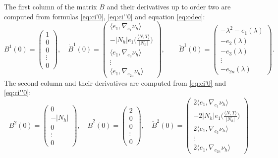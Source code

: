 \documentclass[10pt]{amsart}
\theoremstyle{definition}
\theoremstyle{remark}
\numberwithin{equation}{section}
\begin{document}
The first column of the matrix $B$ and their derivatives up to order two are computed from formulas \eqref{eq:ci'0}, \eqref{eq:ci''0} and equation \eqref{eq:odec}:
\[
B^1(0)=\begin{pmatrix}
1 \\ 0 \\ 0 \\ \vdots \\ 0
\end{pmatrix},\quad
\dot{B}^1(0)=\begin{pmatrix}
{\langle{e_1,\nabla_{e_1}{\nu_{h}}}\rangle} \\ -{|N_{h}|} e_1\big(\tfrac{{\langle{N,T}\rangle}}{|N_{h}|}\big) 
\\ {\langle{e_1,\nabla_{e_3}{\nu_{h}}}\rangle} \\ \vdots \\ {\langle{e_1,\nabla_{e_{2n}}{\nu_{h}}}\rangle}
\end{pmatrix},\qquad
\ddot{B}^1(0)=\begin{pmatrix}
-{\lambda}^2-e_1({\lambda}) \\ -e_2({\lambda}) \\ -e_3({\lambda})\\ \vdots \\ -e_{2n}({\lambda})
\end{pmatrix}.
\]
The second column and their derivatives are computed from \eqref{eq:ci'0} and \eqref{eq:ci''0}:
\[
B^2(0)=\begin{pmatrix} 0 \\ -{|N_{h}|} \\ 0 \\ \vdots \\ 0 \end{pmatrix}, \quad
\dot{B}^2(0)=\begin{pmatrix} 2 \\ 0 \\ 0 \\ \vdots \\ 0 \end{pmatrix}, \quad
\ddot{B}^2(0)=\begin{pmatrix} 2{\langle{e_1,\nabla_{e_1}{\nu_{h}}}\rangle} \\ -2{|N_{h}|} e_1\big(\tfrac{{\langle{N,T}\rangle}}{|N_{h}|}\big) 
\\ 2{\langle{e_1,\nabla_{e_3}{\nu_{h}}}\rangle} \\ \vdots \\ 2{\langle{e_1,\nabla_{e_{2n}}{\nu_{h}}}\rangle}
\end{pmatrix}
\]
\end{document}
